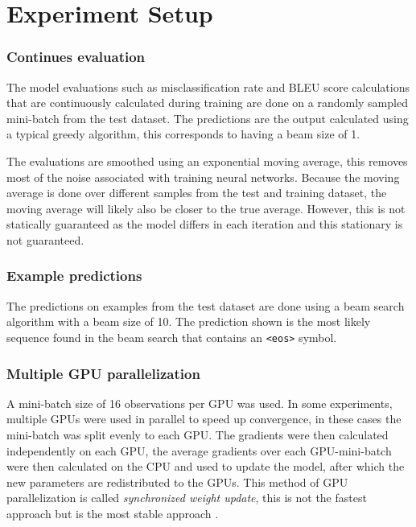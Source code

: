 
\section{Experiment Setup}

\subsubsection{Continues evaluation}
The model evaluations such as misclassification rate and BLEU score calculations that are continuously calculated during training are done on a randomly sampled mini-batch from the test dataset. The predictions are the output calculated using a typical greedy algorithm, this corresponds to having a beam size of 1.

The evaluations are smoothed using an exponential moving average, this removes most of the noise associated with training neural networks. Because the moving average is done over different samples from the test and training dataset, the moving average will likely also be closer to the true average. However, this is not statically guaranteed as the model differs in each iteration and this stationary is not guaranteed.

\subsubsection{Example predictions}
The predictions on examples from the test dataset are done using a beam search algorithm with a beam size of 10. The prediction shown is the most likely sequence found in the beam search that contains an \texttt{<eos>} symbol.

\subsubsection{Multiple GPU parallelization}
A mini-batch size of 16 observations per GPU was used. In some experiments, multiple GPUs were used in parallel to speed up convergence, in these cases the mini-batch was split evenly to each GPU. The gradients were then calculated independently on each GPU, the average gradients over each GPU-mini-batch were then calculated on the CPU and used to update the model, after which the new parameters are redistributed to the GPUs. This method of GPU parallelization is called \textit{synchronized weight update}, this is not the fastest approach but is the most stable approach \cite{citation-needed}.
